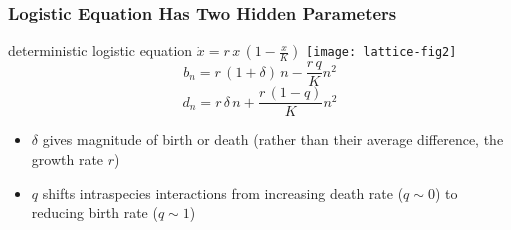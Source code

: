 \documentclass[dvipsnames]{beamer}
\begin{document}
\begin{frame}
\frametitle{Logistic Equation Has Two Hidden Parameters}
\centering
deterministic logistic equation $\dot{x} = r \, x \, \left(1-\frac{x}{K}\right)$
\texttt{[image: lattice-fig2]} \\
\begin{equation*}
b_n = r\,(1 + \delta)\,n - \frac{r\,q}{K}n^2%
\end{equation*}
\begin{equation*}
d_n = r\,\delta\,n + \frac{r\,(1-q)}{K} n^2%
\end{equation*}
\vspace{-0.2cm}
\pause
\begin{itemize}
\item $\delta$ gives magnitude of birth or death (rather than their average difference, the growth rate $r$)
\item $q$ shifts intraspecies interactions from increasing death rate ($q \sim 0$) to reducing birth rate ($q \sim 1$)
\end{itemize}
\end{frame}
\end{document}

